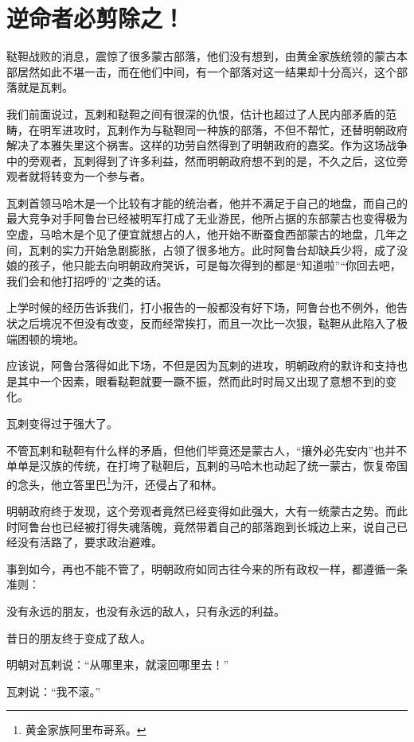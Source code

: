 \section{逆命者必剪除之！}
\ifnum{}
	\begin{multicols}{\theparacolNo}
\fi
鞑靼战败的消息，震惊了很多蒙古部落，他们没有想到，由黄金家族统领的蒙古本部居然如此不堪一击，而在他们中间，有一个部落对这一结果却十分高兴，这个部落就是瓦剌。

我们前面说过，瓦剌和鞑靼之间有很深的仇恨，估计也超过了人民内部矛盾的范畴，在明军进攻时，瓦剌作为与鞑靼同一种族的部落，不但不帮忙，还替明朝政府解决了本雅失里这个祸害。这样的功劳自然得到了明朝政府的嘉奖。作为这场战争中的旁观者，瓦剌得到了许多利益，然而明朝政府想不到的是，不久之后，这位旁观者就将转变为一个参与者。

瓦剌首领马哈木是一个比较有才能的统治者，他并不满足于自己的地盘，而自己的最大竞争对手阿鲁台已经被明军打成了无业游民，他所占据的东部蒙古也变得极为空虚，马哈木是个见了便宜就想占的人，他开始不断蚕食西部蒙古的地盘，几年之间，瓦剌的实力开始急剧膨胀，占领了很多地方。此时阿鲁台却缺兵少将，成了没娘的孩子，他只能去向明朝政府哭诉，可是每次得到的都是“知道啦”“你回去吧，我们会和他打招呼的”之类的话。

上学时候的经历告诉我们，打小报告的一般都没有好下场，阿鲁台也不例外，他告状之后境况不但没有改变，反而经常挨打，而且一次比一次狠，鞑靼从此陷入了极端困顿的境地。

应该说，阿鲁台落得如此下场，不但是因为瓦剌的进攻，明朝政府的默许和支持也是其中一个因素，眼看鞑靼就要一蹶不振，然而此时时局又出现了意想不到的变化。

瓦剌变得过于强大了。

不管瓦剌和鞑靼有什么样的矛盾，但他们毕竟还是蒙古人，“攘外必先安内”也并不单单是汉族的传统，在打垮了鞑靼后，瓦剌的马哈木也动起了统一蒙古，恢复帝国的念头，他立答里巴\footnote{黄金家族阿里布哥系。}为汗，还侵占了和林。

明朝政府终于发现，这个旁观者竟然已经变得如此强大，大有一统蒙古之势。而此时阿鲁台也已经被打得失魂落魄，竟然带着自己的部落跑到长城边上来，说自己已经没有活路了，要求政治避难。

事到如今，再也不能不管了，明朝政府如同古往今来的所有政权一样，都遵循一条准则：

没有永远的朋友，也没有永远的敌人，只有永远的利益。

昔日的朋友终于变成了敌人。

明朝对瓦剌说：“从哪里来，就滚回哪里去！”

瓦剌说：“我不滚。”


\end{multicols}
